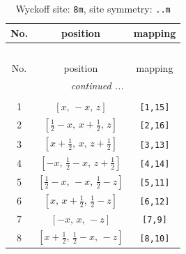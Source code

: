 \documentclass[fleqn,8pt]{jsarticle}
\begin{document}
\begin{longtable}{ccc}
\caption{Wyckoff site: {\tt 8m}, site symmetry: {\tt ..m}}
 \\
 \hline \hline
No. & position & mapping \\ \hline \endfirsthead

\multicolumn{2}{l}{\tablename\ \thetable{}} \\
 \hline \hline
No. & position & mapping \\ \hline \endhead

 \hline \hline
\multicolumn{2}{r}{\footnotesize\it continued ...} \\ \endfoot

 \hline \hline
\multicolumn{2}{r}{} \\ \endlastfoot

1 & $\left[ x,\, - x,\, z \right]$ & {\tt [1,15]} \\ \hline
2 & $\left[ \frac{1}{2} - x,\, x + \frac{1}{2},\, z \right]$ & {\tt [2,16]} \\ \hline
3 & $\left[ x + \frac{1}{2},\, x,\, z + \frac{1}{2} \right]$ & {\tt [3,13]} \\ \hline
4 & $\left[ - x,\, \frac{1}{2} - x,\, z + \frac{1}{2} \right]$ & {\tt [4,14]} \\ \hline
5 & $\left[ \frac{1}{2} - x,\, - x,\, \frac{1}{2} - z \right]$ & {\tt [5,11]} \\ \hline
6 & $\left[ x,\, x + \frac{1}{2},\, \frac{1}{2} - z \right]$ & {\tt [6,12]} \\ \hline
7 & $\left[ - x,\, x,\, - z \right]$ & {\tt [7,9]} \\ \hline
8 & $\left[ x + \frac{1}{2},\, \frac{1}{2} - x,\, - z \right]$ & {\tt [8,10]} \\
\end{longtable}
\renewcommand{\arraystretch}{1.2}
\end{document}
